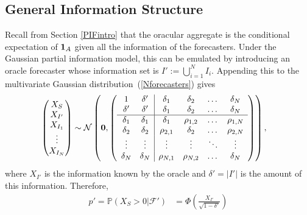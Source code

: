\documentclass[11pt]{article}
\renewcommand{\P}{\mathbb{P}}
\theoremstyle{definition}
\theoremstyle{definition}
\def\one{{\bf 1}}
\def\P{{\mathbb P}}
\begin{document}
\subsection{General Information Structure}
Recall from Section \ref{PIFintro} that the oracular aggregate is the conditional expectation of $\one_A$ given all the information of the forecasters. Under the Gaussian partial information model, this can be emulated by introducing an oracle forecaster whose information set is $I' := \bigcup_{i=1}^N I_i$.
Appending this to the multivariate Gaussian distribution~(\ref{Nforecasters}) gives
\begin{align}
\left(\begin{matrix} X_S \\ X_{I'} \\ X_{I_1}\\ \vdots \\ X_{I_N} 
 \end{matrix}\right) &\sim \mathcal{N}\left( 
 \boldsymbol{0}, 
% 
 \left(\begin{array}{c c| c c cc }
1 & \delta' & \delta_1 & \delta_2 & \dots & \delta_N  \\ 
\delta' & \delta' & \delta_1 & \delta_2 & \dots & \delta_N  \\ \hline
\delta_1& \delta_1 & \delta_1 &\rho_{1,2} & \dots & \rho_{1,N}   \\ 
\delta_2 & \delta_2 &\rho_{2,1} & \delta_2 & \dots & \rho_{2,N}  \\ 
\vdots &\vdots & \vdots & \vdots & \ddots & \vdots  \\ 
\delta_N &\delta_N & \rho_{N,1} & \rho_{N,2} & \dots & \delta_N\\ 
 \end{array}\right)\right), \label{oracleN} 
\end{align}
where  $X_{I'}$  is the information known by the oracle and $\delta' = |I'|$ is the amount of this information.  Therefore, 
 \begin{align*}
p' = \P(X_S > 0 |  \mathcal{F}') 
   &= \Phi\left( \frac{X_{I'}}{\sqrt{1-\delta'}} \right)
\end{align*}
\end{document}
